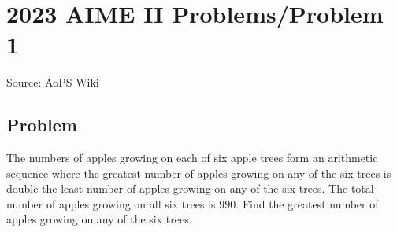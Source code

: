 \documentclass[12pt]{article}
\begin{document}
\section*{{2023 AIME II Problems/Problem 1}}
Source: AoPS Wiki

\subsection*{Problem}
The numbers of apples growing on each of six apple trees form an arithmetic sequence where the greatest number of apples growing on any of the six trees is double the least number of apples growing on any of the six trees. The total number of apples growing on all six trees is $990.$ Find the greatest number of apples growing on any of the six trees.
\end{document}
